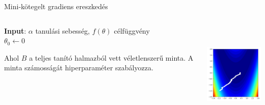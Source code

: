 \documentclass[english, aspectratio=169]{beamer}
\begin{document}
\begin{frame}{Mini-kötegelt gradiens ereszkedés}
\begin{columns}
\begin{column}{.7\textwidth}
\begin{algorithm}[H]
\caption{Mini-kötegelt gradiens ereszkedés}
\SetAlgoLined
\textbf{Input}: $\alpha$ tanulási sebesség, $f(\theta)$ célfüggvény\\
$\theta_0 \leftarrow 0$ 
\end{algorithm}
Ahol $B$ a teljes tanító halmazból vett véletlenszerű minta. A minta számosságát hiperparaméter szabályozza. 
\end{column}
\begin{column}{.3\textwidth}
\begin{center}
\includegraphics[height=5cm, width=5cm, keepaspectratio]{images/gd_minibatch.png}
\end{center}
\end{column}
\end{columns}
\end{frame}
\end{document}
